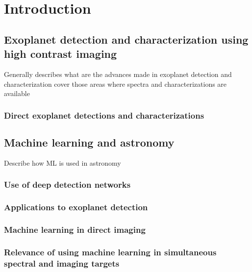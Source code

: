 \part{Introduction}
\addto{\captionsenglish}{%
  \renewcommand{\mtctitle}{Another Title}
}

\startcontents[chapters]
\printmyminitoc{
}


\chapter{Exoplanet detection and characterization using high contrast imaging}
Generally describes what are the advances made in exoplanet detection and characterization
cover those areas where spectra and characterizations are available
\section{Direct exoplanet detections and characterizations}
\chapter{Machine learning and astronomy}
Describe how ML is used in astronomy
\section{Use of deep detection networks}
\section{Applications to exoplanet detection}
\section{Machine learning in direct imaging}
\section{Relevance of using machine learning in simultaneous spectral and imaging targets}
